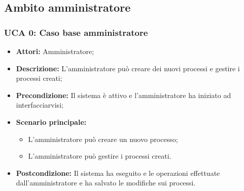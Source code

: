 \subsection{Ambito amministratore}

\hypertarget{A0}{}
\subsubsection{UCA 0: Caso base amministratore}
\begin{itemize}
\item \textbf{Attori:} Amministratore;
\item \textbf{Descrizione:} L'amministratore può creare dei nuovi processi e gestire i processi creati;
\item \textbf{Precondizione:} Il sistema è attivo e l'amministratore ha iniziato ad interfacciarvisi;
\item \textbf{Scenario principale:} 
\begin{itemize}
\item L'amministratore può creare un nuovo processo;
\item L'amministratore può gestire i processi creati.
\end{itemize}
\item \textbf{Postcondizione:} Il sistema ha eseguito e le operazioni effettuate dall'amministratore e ha salvato le modifiche sui processi.
\end{itemize}

\hypertarget{A1}{}
